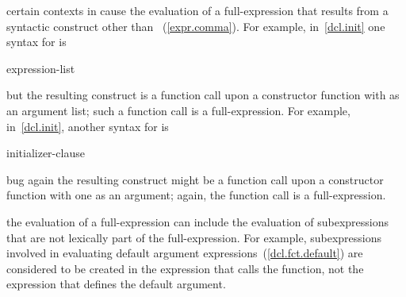 \pnum
\enternote certain contexts in \Cpp cause the evaluation of a full-expression
that results from a syntactic construct other than
~(\ref{expr.comma}).
For example, in~\ref{dcl.init} one syntax for  is

\begin{ncbnf}
\terminal{(} expression-list \terminal{)}
\end{ncbnf}

but the resulting construct is a function call upon a constructor function with
 as an argument list; such a function call is
a full-expression. For example, in~\ref{dcl.init}, another syntax for
 is

\begin{ncbnf}
\terminal{=} initializer-clause
\end{ncbnf}

bug again the resulting construct might be a function call upon a constructor
function with one  as an argument;
again, the function call is a full-expression. \exitnote

\pnum
\enternote the evaluation of a full-expression can include the
evaluation of subexpressions that are not lexically part of the
full-expression. For example, subexpressions involved in evaluating
default argument expressions~(\ref{dcl.fct.default}) are considered to
be created in the expression that calls the function, not the expression
that defines the default argument. \exitnote

